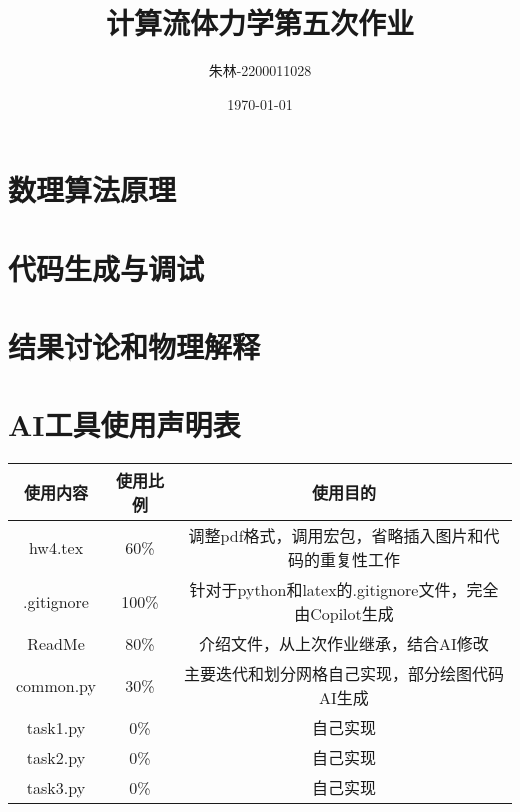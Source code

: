 \documentclass[UTF8]{ctexart}
\begin{document}
\title{计算流体力学第五次作业}
\author{朱林-2200011028}
\date{\today}
\maketitle


\section{数理算法原理}




\section{代码生成与调试}


\section{结果讨论和物理解释}



\newpage
\appendix
\section{AI工具使用声明表}
\begin{table}[H]
    \centering
    \begin{tabular}{c|c|c}
        \hline
        使用内容 & 使用比例 & 使用目的 \\ \hline
        hw4.tex & 60\% & 调整pdf格式，调用宏包，省略插入图片和代码的重复性工作 \\ 
        .gitignore & 100\% & 针对于python和latex的.gitignore文件，完全由Copilot生成  \\
        ReadMe & 80\% & 介绍文件，从上次作业继承，结合AI修改 \\
        common.py & 30\% & 主要迭代和划分网格自己实现，部分绘图代码AI生成  \\
        task1.py & 0\% & 自己实现 \\
        task2.py & 0\% & 自己实现 \\
        task3.py & 0\% & 自己实现 \\
        \hline
    \end{tabular}
    \label{tab:AI_tools}
\end{table}
\end{document}

